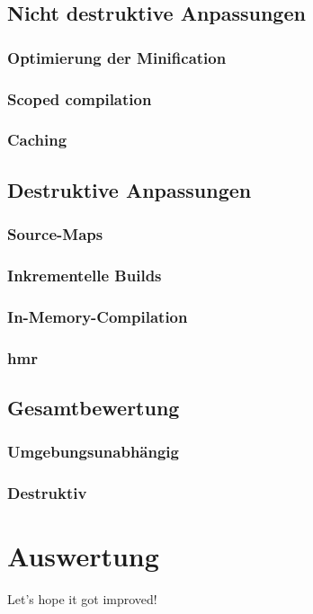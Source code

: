 \documentclass[11pt]{report}
\begin{document}
        \section{Nicht destruktive Anpassungen}
        	\subsection{Optimierung der Minification} %
        	\subsection{Scoped compilation} %
    		\subsection{Caching}

    	\section{Destruktive Anpassungen}
    		\subsection{Source-Maps} %
    		\subsection{Inkrementelle Builds}
    		\subsection{In-Memory-Compilation}
    		\subsection{\Gls{hmr}}

		\section{Gesamtbewertung}
			\subsection{Umgebungsunabhängig}
			\subsection{Destruktiv}

	\chapter{Auswertung}
		Let's hope it got improved! %
		
\end{document}
